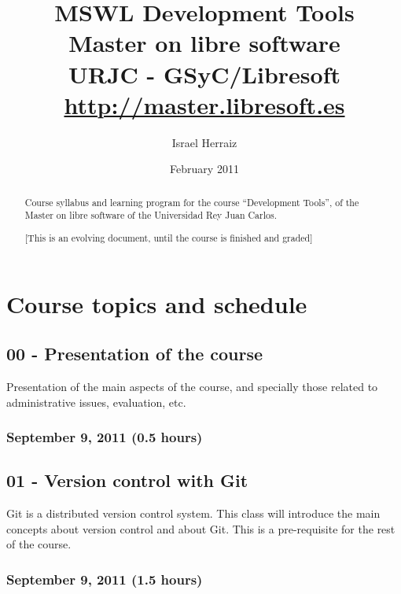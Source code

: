 \documentclass[a4paper]{article}
\title{MSWL Development Tools \\
Master on libre software \\
URJC - GSyC/Libresoft \\
\url{http://master.libresoft.es}}
\author{Israel Herraiz}
\date{February 2011}
\begin{document}
\maketitle

\begin{abstract}
Course syllabus and learning program for the course ``Development
Tools'', of the Master on libre software of the Universidad Rey Juan
Carlos.

[This is an evolving document, until the course is finished and graded]
\end{abstract}

\tableofcontents

\section{Course topics and schedule}

\subsection{00 - Presentation of the course}

Presentation of the main aspects of the course, and specially those
related to administrative issues, evaluation, etc.

\subsubsection{September 9, 2011 (0.5 hours)}

\subsection{01 - Version control with Git}

Git is a distributed version control system. This class will introduce
the main concepts about version control and about Git. This is a
pre-requisite for the rest of the course.

\subsubsection{September 9, 2011 (1.5 hours)}
\end{document}
